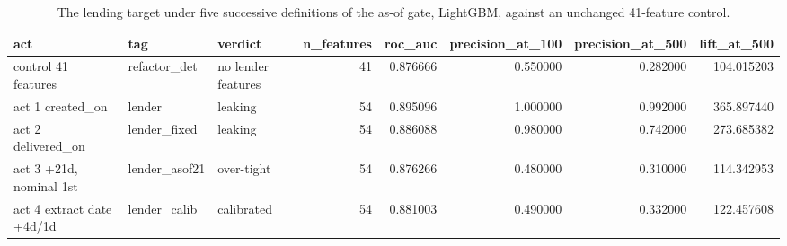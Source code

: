 \begin{table}
\caption{The lending target under five successive definitions of the as-of gate, LightGBM, against an unchanged 41-feature control.}
\label{tab:19_gate_progression}
\begin{tabular}{lllrrrrr}
\toprule
act & tag & verdict & n_features & roc_auc & precision_at_100 & precision_at_500 & lift_at_500 \\
\midrule
control 41 features & refactor_det & no lender features & 41 & 0.876666 & 0.550000 & 0.282000 & 104.015203 \\
act 1 created_on & lender & leaking & 54 & 0.895096 & 1.000000 & 0.992000 & 365.897440 \\
act 2 delivered_on & lender_fixed & leaking & 54 & 0.886088 & 0.980000 & 0.742000 & 273.685382 \\
act 3 +21d, nominal 1st & lender_asof21 & over-tight & 54 & 0.876266 & 0.480000 & 0.310000 & 114.342953 \\
act 4 extract date +4d/1d & lender_calib & calibrated & 54 & 0.881003 & 0.490000 & 0.332000 & 122.457608 \\
\bottomrule
\end{tabular}
\end{table}
